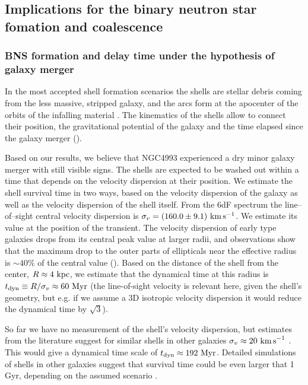 
\subsection{Implications for the binary neutron star fomation and coalescence}\label{implications}

\subsubsection{BNS formation and delay time under the hypothesis of galaxy merger}

In the most accepted shell formation scenarios the shells are stellar debris coming from the less massive, stripped galaxy, and the arcs form at the apocenter of the orbits of the infalling material \citep{quinn}. The kinematics of the shells allow to connect their position, the gravitational potential of the galaxy and the time elapsed since the galaxy merger (\citealt{1986A&A...166...53D,2012A&A...545A..33E}).

Based on our results, we believe that NGC4993 experienced a dry minor galaxy merger with still visible signs. The shells are expected to be washed out within a time that depends on the velocity dispersion at their position. We estimate the shell survival time in two ways, based on the velocity dispersion of the galaxy as well as the velocity dispersion of the shell itself. From the 6dF spectrum the  line--of--sight central velocity dispersion is $\sigma_v=(160.0\pm 9.1)~{\rm km\, s^{-1}}$. We estimate its value at the position of the transient. 
The velocity dispersion of early type galaxies drops from its central peak value at larger radii, and observations show that the maximum drop to the outer parts of ellipticals near the effective radius is $\sim 40\%$ of the central value (\citealt{emsellem}). Based on the distance of the shell from the center, $R \approx  4 ~{\rm kpc}$, we estimate that the dynamical time at this radius is
$t_{\rm dyn} \equiv  R/\sigma_{v} \approx 60 ~{\rm Myr}$ (the line-of-sight velocity is relevant here, given the shell's geometry, but e.g. if we assume a 3D isotropic velocity dispersion it would reduce the dynamical time by $\sqrt{3}$).

So far we have no measurement of the shell's velocity dispersion, but estimates from the literature suggest for similar shells in other galaxies
$\sigma_v \approx  20 ~{\rm km\,s}^{-1}$ \citep{quinn}. This would give a dynamical time scale of $t_{\rm dyn} \approx  192~ {\rm Myr}$. 
Detailed simulations of  shells in other galaxies suggest that survival time could be even larger that 1 Gyr,  depending on the assumed scenario \citep{pop}.

